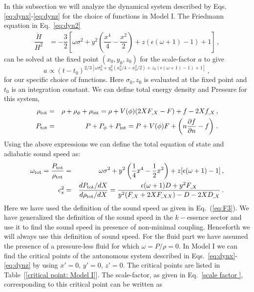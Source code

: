 \documentclass[a4paper,12pt]{article}
\newcommand{\p}{\ensuremath{\partial{}}}
\newcommand{\fx}{\ensuremath{\dfrac{x^4}{4}-\dfrac{x^2}{2} }} %
\begin{document}
In this subsection we will analyze the dynamical system described by Eqs.~ \eqref{eq:dynx}-\eqref{eq:dynz} for the choice of functions in Model I. The Friedmann equation in Eq.~\eqref{eq:dyn2}  
\begin{eqnarray}
\dfrac{\dot{H}}{H^2} & = -\dfrac32 \left[ \omega \sigma^2 + y^2 \left(\fx \right)  +z(\epsilon(\omega +1)-1)+1\right]\,, 
\end{eqnarray}
can be solved at the fixed point $(x_{0},y_{0},z_{0})$ for the scale-factor $a$ to give
\begin{equation}\label{scale factor }
a \propto (t-t_{0})^{2/3[\omega \sigma_{0}^2 +y_{0}^2(x_{0}^4/4-x_{0}^2/2) +z_{0}(\epsilon(\omega +1)-1) +1 ]}\,,
\end{equation}
for our specific choice of functions. Here $\sigma_{0}, z_0$ is evaluated at the fixed point and $t_0$ is an integration constant. We can define total energy density and Pressure for this system,
\begin{eqnarray}
\rho_{\rm tot} &=& \rho + \rho_{\phi} +\rho_{\rm int} =\rho + V(\phi) (2XF_{,X}-F) + f-2Xf_{,X}\,,   \\
P_{\rm tot} &=& P + P_{\phi} + P_{\rm int} = P + V(\phi)F + \left(n\dfrac{\p f}{\p n} -f \right)\,. 
\end{eqnarray}
Using the above expressions we can define the total equation of state and adiabatic sound speed as:
\begin{eqnarray}
  \omega_{\rm tot}=\frac{P_{\rm tot}}{\rho_{\rm tot}} &=& {\omega \sigma^2 +y^2 \left(\frac14 x^4-\frac12 x^2\right) +z [\epsilon(\omega +1)-1]}\,,
\label{omega1}\\
c_s^2 &=& \dfrac{dP_{\rm tot}/dX}{d\rho_{\rm tot}/dX} =  \dfrac{\epsilon(\omega+1)D+y^2 F_{,X} }{y^2(F_{,X} + 2XF_{,XX}) - D -2XD_{,X}}\,. 
\end{eqnarray}
Here we have used the definition of the sound speed as given in Eq.~(\ref{eq:F3}). We have generalized the definition of the sound speed in the $k-$essence sector and use it to find the sound speed in presence of  non-minimal coupling. Henceforth we will always use this definition of sound speed. For the fluid part we have assumed the presence of a pressure-less fluid for which $\omega = P/\rho = 0$. In Model I we can find the critical points of the autonomous system described in Eqs.~\eqref{eq:dynx}-\eqref{eq:dynz} by using 
$ x'=0,\, y'=0,\,z'=0$. The critical points  are listed in Table~[\ref{critical point: Model I}]. The scale-factor, as given in Eq.~\eqref{scale factor }, corresponding to this critical point can be written as
\end{document}

